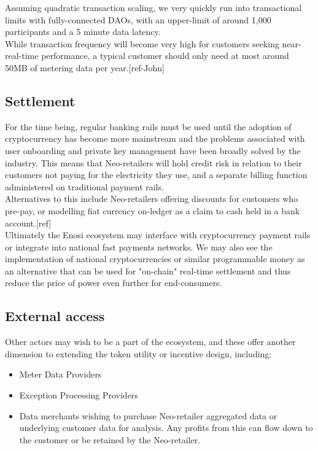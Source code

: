 \documentclass{article}
\theoremstyle{definition}
\theoremstyle{plain} %
\begin{document}
\noindent Assuming quadratic transaction scaling, we very quickly run into transactional limits with fully-connected DAOs, with an upper-limit of around 1,000 participants and a 5 minute data latency.\\

\noindent While transaction frequency will become very high for customers seeking near-real-time performance, a typical customer should only need at most around 50MB of metering data per year.[ref-John]

\subsection{Settlement}

\noindent For the time being, regular banking rails must be used until the adoption of cryptocurrency has become more mainstream and the problems associated with user onboarding and private key management have been broadly solved by the industry. This means that Neo-retailers will hold credit risk in relation to their customers not paying for the electricity they use, and a separate billing function administered on traditional payment rails. \\

\noindent Alternatives to this include Neo-retailers offering discounts for customers who pre-pay, or modelling fiat currency on-ledger as a claim to cash held in a bank account.[ref] \\

\noindent Ultimately the Enosi ecosystem may interface with cryptocurrency payment rails or integrate into national fast payments networks. We may also see the implementation of national cryptocurrencies or similar programmable money as an alternative that can be used for "on-chain" real-time settlement and thus reduce the price of power even further for end-consumers.

\subsection{External access}

Other actors may wish to be a part of the ecosystem, and these offer another dimension to extending the token utility or incentive design, including:

\begin{itemize}
\item{Meter Data Providers}
\item{Exception Processing Providers}
\item{Data merchants wishing to purchase Neo-retailer aggregated data or underlying customer data for analysis. Any profits from this can flow down to the customer or be retained by the Neo-retailer.}
\end{itemize}
\end{document}
